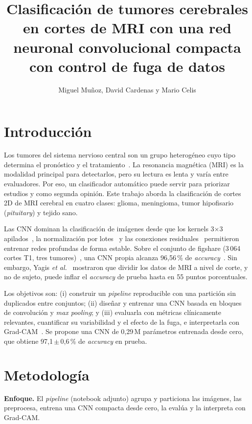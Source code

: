 \documentclass[letterpaper, 10 pt, conference]{ieeeconf}  %
\title{\LARGE \bf
Clasificación de tumores cerebrales en cortes de MRI con una red neuronal convolucional compacta con control de fuga de datos
}
\author{Miguel Muñoz, David Cardenas y Mario Celis}
\begin{document}
\maketitle
\thispagestyle{empty}
\pagestyle{empty}

\section{Introducción}
Los tumores del sistema nervioso central son un grupo heterogéneo cuyo tipo determina el pronóstico y el tratamiento~\cite{c1}. La resonancia magnética (MRI) es la modalidad principal para detectarlos, pero su lectura es lenta y varía entre evaluadores. Por eso, un clasificador automático puede servir para priorizar estudios y como segunda opinión. Este trabajo aborda la clasificación de cortes 2D de MRI cerebral en cuatro clases: glioma, meningioma, tumor hipofisario (\textit{pituitary}) y tejido sano.

Las CNN dominan la clasificación de imágenes desde que los kernels 3$\times$3 apilados~\cite{c2}, la normalización por lotes~\cite{c3} y las conexiones residuales~\cite{c4} permitieron entrenar redes profundas de forma estable. Sobre el conjunto de figshare (3\,064 cortes T1, tres tumores)~\cite{c5}, una CNN propia alcanza 96,56\,\% de \textit{accuracy}~\cite{c6}. Sin embargo, Yagis \textit{et al.}~\cite{c7} mostraron que dividir los datos de MRI a nivel de corte, y no de sujeto, puede inflar el \textit{accuracy} de prueba hasta en 55 puntos porcentuales.

Los objetivos son: (i) construir un \textit{pipeline} reproducible con una partición sin duplicados entre conjuntos; (ii) diseñar y entrenar una CNN basada en bloques de convolución y \textit{max pooling}; y (iii) evaluarla con métricas clínicamente relevantes, cuantificar su variabilidad y el efecto de la fuga, e interpretarla con Grad-CAM~\cite{c9}. Se propone una CNN de 0,29\,M parámetros entrenada desde cero, que obtiene 97,1\,$\pm$\,0,6\,\% de \textit{accuracy} en prueba.



\section{Metodología}
\textbf{Enfoque.} El \textit{pipeline} (notebook adjunto) agrupa y particiona las imágenes, las preprocesa, entrena una CNN compacta desde cero, la evalúa y la interpreta con Grad-CAM.
\end{document}
